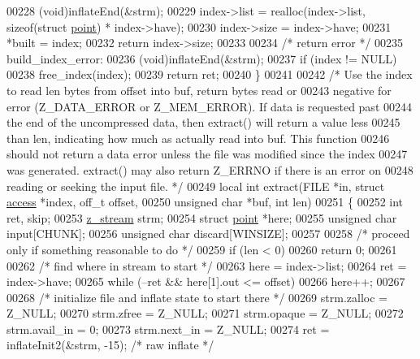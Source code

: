 \begin{DoxyCode}
00228     (void)inflateEnd(&strm);
00229     index->list = realloc(index->list, \textcolor{keyword}{sizeof}(\textcolor{keyword}{struct} \hyperlink{structpoint}{point}) * index->have);
00230     index->size = index->have;
00231     *built = index;
00232     \textcolor{keywordflow}{return} index->size;
00233 
00234     \textcolor{comment}{/* return error */}
00235   build\_index\_error:
00236     (void)inflateEnd(&strm);
00237     \textcolor{keywordflow}{if} (index != NULL)
00238         free\_index(index);
00239     \textcolor{keywordflow}{return} ret;
00240 \}
00241 
00242 \textcolor{comment}{/* Use the index to read len bytes from offset into buf, return bytes read or}
00243 \textcolor{comment}{   negative for error (Z\_DATA\_ERROR or Z\_MEM\_ERROR).  If data is requested past}
00244 \textcolor{comment}{   the end of the uncompressed data, then extract() will return a value less}
00245 \textcolor{comment}{   than len, indicating how much as actually read into buf.  This function}
00246 \textcolor{comment}{   should not return a data error unless the file was modified since the index}
00247 \textcolor{comment}{   was generated.  extract() may also return Z\_ERRNO if there is an error on}
00248 \textcolor{comment}{   reading or seeking the input file. */}
00249 local \textcolor{keywordtype}{int} extract(FILE *in, \textcolor{keyword}{struct} \hyperlink{structaccess}{access} *index, off\_t offset,
00250                   \textcolor{keywordtype}{unsigned} \textcolor{keywordtype}{char} *buf, \textcolor{keywordtype}{int} len)
00251 \{
00252     \textcolor{keywordtype}{int} ret, skip;
00253     \hyperlink{structz__stream__s}{z\_stream} strm;
00254     \textcolor{keyword}{struct }\hyperlink{structpoint}{point} *here;
00255     \textcolor{keywordtype}{unsigned} \textcolor{keywordtype}{char} input[CHUNK];
00256     \textcolor{keywordtype}{unsigned} \textcolor{keywordtype}{char} discard[WINSIZE];
00257 
00258     \textcolor{comment}{/* proceed only if something reasonable to do */}
00259     \textcolor{keywordflow}{if} (len < 0)
00260         \textcolor{keywordflow}{return} 0;
00261 
00262     \textcolor{comment}{/* find where in stream to start */}
00263     here = index->list;
00264     ret = index->have;
00265     \textcolor{keywordflow}{while} (--ret && here[1].out <= offset)
00266         here++;
00267 
00268     \textcolor{comment}{/* initialize file and inflate state to start there */}
00269     strm.zalloc = Z\_NULL;
00270     strm.zfree = Z\_NULL;
00271     strm.opaque = Z\_NULL;
00272     strm.avail\_in = 0;
00273     strm.next\_in = Z\_NULL;
00274     ret = inflateInit2(&strm, -15);         \textcolor{comment}{/* raw inflate */}

\end{DoxyCode}
